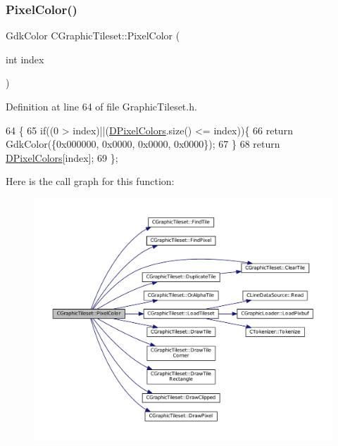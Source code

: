 \subsubsection{\texorpdfstring{Pixel\+Color()}{PixelColor()}}
{\footnotesize\ttfamily Gdk\+Color C\+Graphic\+Tileset\+::\+Pixel\+Color (\begin{DoxyParamCaption}\item[{int}]{index }\end{DoxyParamCaption})\hspace{0.3cm}{\ttfamily [inline]}}



Definition at line 64 of file Graphic\+Tileset.\+h.


\begin{DoxyCode}
64                                       \{
65             \textcolor{keywordflow}{if}((0 > index)||(\hyperlink{classCGraphicTileset_a4e9672b8b133dbac600fb8bb400d1cb3}{DPixelColors}.size() <= index))\{
66                 \textcolor{keywordflow}{return} GdkColor(\{0x000000, 0x0000, 0x0000, 0x0000\});
67             \}
68             \textcolor{keywordflow}{return} \hyperlink{classCGraphicTileset_a4e9672b8b133dbac600fb8bb400d1cb3}{DPixelColors}[index];
69         \};
\end{DoxyCode}
Here is the call graph for this function\+:
\nopagebreak
\begin{figure}[H]
\begin{center}
\leavevmode
\includegraphics[width=350pt]{classCGraphicTileset_af278c60b01100c430bedfcedd9e9489f_cgraph}
\end{center}
\end{figure}
\hypertarget{classCGraphicTileset_af99f4b0ce58d25a5baaf836c74472910}{}\label{classCGraphicTileset_af99f4b0ce58d25a5baaf836c74472910} 
